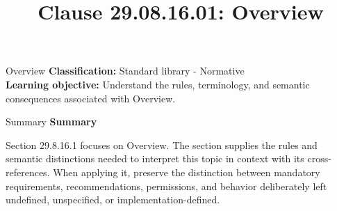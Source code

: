 \documentclass[10pt,letterpaper]{article}
\title{Clause 29.08.16.01: Overview}
\author{}
\date{}
\begin{document}
\maketitle
\begin{CornellOverviewBox}{Overview}
\textbf{Classification:} Standard library - Normative\\[2pt]
\textbf{Learning objective:} Understand the rules, terminology, and semantic consequences associated with Overview.
\end{CornellOverviewBox}\begin{CornellSummaryBox}{Summary}
{\sffamily\bfseries\color{Accent} Summary}\par\vspace{3pt}Section 29.8.16.1 focuses on Overview. The section supplies the rules and semantic distinctions needed to interpret this topic in context with its cross-references. When applying it, preserve the distinction between mandatory requirements, recommendations, permissions, and behavior deliberately left undefined, unspecified, or implementation-defined.
\end{CornellSummaryBox}
\end{document}
